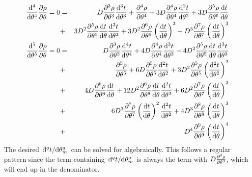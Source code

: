 \documentclass[11pt]{article} %
\begin{document}
\begin{eqnarray}
	\dv[4]{ }{\theta} \pdv{\rho}{\theta} = 
	0 & = & D \pdv[3]{\rho}{\theta} \dv[3]{t}{\theta}  + \pdv[4]{\rho}{\theta}  + 3 D \pdv[4]{\rho}{\theta} \dv[2]{t}{\theta}  + 3 D \pdv[5]{\rho}{\theta} \dv{t}{\theta}  \\
	& + & 3 D^2 \pdv[5]{\rho}{\theta} \dv{t}{\theta} \dv[2]{t}{\theta}  + 3 D^2 \pdv[6]{\rho}{\theta} \left(\dv{t}{\theta}\right)^2  + D^3 \pdv[7]{\rho}{\theta} \left(\dv{t}{\theta}\right)^3 \\
	\dv[5]{ }{\theta} \pdv{\rho}{\theta} = 
	0 & = & D \pdv[3]{\rho}{\theta} \dv[4]{t}{\theta}  + 4 D \pdv[4]{\rho}{\theta} \dv[3]{t}{\theta}  + 4 D^2 \pdv[5]{\rho}{\theta} \dv{t}{\theta} \dv[3]{t}{\theta}  \\
	& + & \pdv[5]{\rho}{\theta}  + 6 D \pdv[5]{\rho}{\theta} \dv[2]{t}{\theta}  + 3 D^2 \pdv[5]{\rho}{\theta} \left(\dv[2]{t}{\theta}\right)^2  \\ 
	& + & 4 D \pdv[6]{\rho}{\theta} \dv{t}{\theta}  + 12 D^2 \pdv[6]{\rho}{\theta} \dv{t}{\theta} \dv[2]{t}{\theta}  + 6 D^2 \pdv[7]{\rho}{\theta} \left(\dv{t}{\theta}\right)^2\\
	& + & 6 D^3 \pdv[7]{\rho}{\theta} \left(\dv{t}{\theta}\right)^2 \dv[2]{t}{\theta}  + 4 D^3 \pdv[8]{\rho}{\theta} \left(\dv{t}{\theta}\right)^3  \\
	& + & D^4 \pdv[9]{\rho}{\theta} \left(\dv{t}{\theta}\right)^4 
\end{eqnarray}
The desired $ \dv*[q]{t}{\theta_m} $ can be solved for algebraically. This follows a regular pattern since the term containing $ \dv*[q]{t}{\theta_m} $ is always the term with $ D \pdv[3] {\rho}{\theta} $, which will end up in the denominator.
\end{document}
